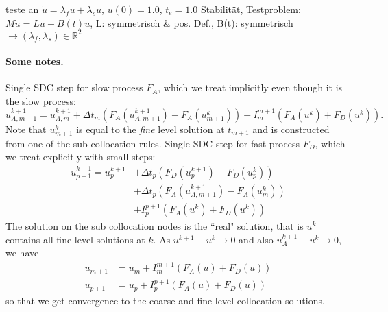 \documentclass{article}
\begin{document}
  teste an $\dot u=\lambda_fu + \lambda_s u$, $u(0)=1.0$, $t_e=1.0$
 Stabilität, Testproblem: $M\dot u = Lu+B(t)u$, L: symmetrisch \& pos. Def., B(t): symmetrisch $\rightarrow (\lambda_f, \lambda_s)\in \mathbb{R}^2$
 
\paragraph{Some notes.}
Single SDC step for slow process $F_A$, which we treat implicitly even though it is the slow process:
\begin{equation*}
	u_{A,m+1}^{k+1} = u_{A,m}^{k+1} + \Delta t_m \left( F_{A}(u^{k+1}_{A,m+1}) -F_{A}(u^{k}_{m+1}) \right) + I_m^{m+1}\left( F_{A}(u^k) + F_{D}(u^k) \right).
\end{equation*}
Note that $u^k_{m+1}$ is equal to the \emph{fine} level solution at $t_{m+1}$ and is constructed from one of the sub collocation rules.
Single SDC step for fast process $F_D$, which we treat explicitly with small steps:
\begin{align*}
	u_{p+1}^{k+1} = u_{p}^{k+1} &+ \Delta t_p \left( F_{D}(u^{k+1}_{p}) - F_{D}(u^k_p) \right) \\
							   &+ \Delta t_p \left( F_{A}(u^{k+1}_{A,m+1}) - F_{A}(u^k_m) \right) \\
							   &+ I_p^{p+1}\left( F_A(u^k) + F_D(u^k) \right)
\end{align*}
The solution on the sub collocation nodes is the ``real" solution, that is $u^k$ contains all fine level solutions at $k$.
As $u^{k+1} - u^k \to 0$ and also $u^{k+1}_A - u^k \to 0$, we have
\begin{align*}
	u_{m+1} &= u_{m} + I_m^{m+1} \left( F_A(u) + F_D(u) \right) \\
	u_{p+1} &= u_{p} + I_{p}^{p+1} \left( F_A(u) + F_D(u) \right)
\end{align*}
so that we get convergence to the coarse and fine level collocation solutions.
\end{document}
